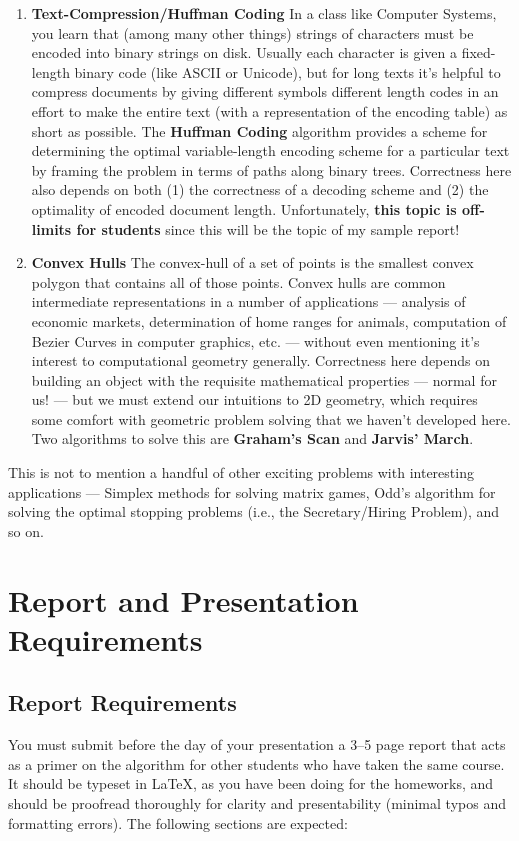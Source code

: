 \documentclass{article}
\begin{document}
\begin{enumerate}
    \item \textbf{Text-Compression/Huffman Coding} In a class like Computer Systems, you learn that (among many other things) strings of characters must be encoded into binary strings on disk. Usually each character is given a fixed-length binary code (like ASCII or Unicode), but for long texts it's helpful to compress documents by giving different symbols different length codes in an effort to make the entire text (with a representation of the encoding table) as short as possible. The \textbf{Huffman Coding} algorithm provides a scheme for determining the optimal variable-length encoding scheme for a particular text by framing the problem in terms of paths along binary trees. Correctness here also depends on both (1) the correctness of a decoding scheme and (2) the optimality of encoded document length. Unfortunately, \textbf{this topic is off-limits for students} since this will be the topic of my sample report!

    \item \textbf{Convex Hulls} The convex-hull of a set of points is the smallest convex polygon that contains all of those points. Convex hulls are common intermediate representations in a number of applications --- analysis of economic markets, determination of home ranges for animals, computation of Bezier Curves in computer graphics, etc. --- without even mentioning it's interest to computational geometry generally. Correctness here depends on building an object with the requisite mathematical properties --- normal for us! --- but we must extend our intuitions to 2D geometry, which requires some comfort with geometric problem solving that we haven't developed here. Two algorithms to solve this are \textbf{Graham's Scan} and \textbf{Jarvis' March}. 
\end{enumerate}

This is not to mention a handful of other exciting problems with interesting applications --- Simplex methods for solving matrix games, Odd's algorithm for solving the optimal stopping problems (i.e., the Secretary/Hiring Problem), and so on. 

\section{Report and Presentation Requirements}

\subsection{Report Requirements}
You must submit before the day of your presentation a 3--5 page report that acts as a primer on the algorithm for other students who have taken the same course. It should be typeset in LaTeX, as you have been doing for the homeworks, and should be proofread thoroughly for clarity and presentability (minimal typos and formatting errors). The following sections are expected:
\end{document}
